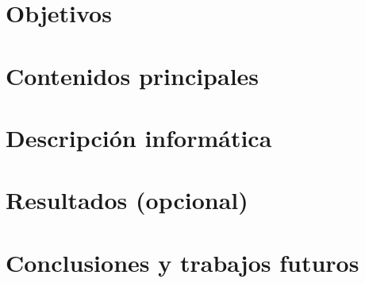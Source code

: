 \documentclass[12pt,twoside,titlepage]{report}
\newcommand\blankpage{%
    \newpage
    \null
    \thispagestyle{empty}%
    \newpage}
\begin{document}

\pagestyle{fancy}


\setlength{\parskip}{0.75em}
\renewcommand{\baselinestretch}{1.25}
\setcounter{page}{1}






\chapter{Objetivos}



\blankpage

\chapter{Contenidos principales}
\label{chap:contenidos}



\chapter{Descripción informática}


\blankpage


\chapter{Resultados (opcional)}
\label{sec:resulObtenidos}



\blankpage


\chapter{Conclusiones y trabajos futuros}



\blankpage
\end{document}
